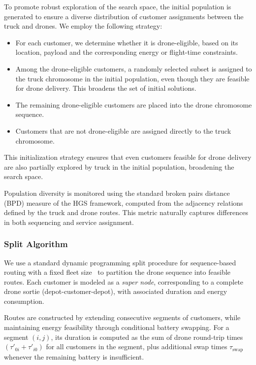 \documentclass[3p, authoryear, 11pt]{elsarticle}
\begin{document}
To promote robust exploration of the search space, the initial population is generated to ensure a diverse distribution of customer assignments between the truck and drones. We employ the following strategy:

\begin{itemize}
    \item For each customer, we determine whether it is drone-eligible, based on its location, payload and the corresponding energy or flight-time constraints.
    \item Among the drone-eligible customers, a randomly selected subset is assigned to the truck chromosome in the initial population, even though they are feasible for drone delivery. This broadens the set of initial solutions.
    \item The remaining drone-eligible customers are placed into the drone chromosome sequence.
    \item Customers that are not drone-eligible are assigned directly to the truck chromosome.
\end{itemize}

This initialization strategy ensures that even customers feasible for drone delivery are also partially explored by truck in the initial population, broadening the search space.

Population diversity is monitored using the standard broken pairs distance (BPD) measure of the HGS framework, computed from the adjacency relations defined by the truck and drone routes. This metric naturally captures differences in both sequencing and service assignment.

\subsubsection{Split Algorithm}

We use a standard dynamic programming split procedure for sequence-based routing with a fixed fleet size~\citep{prins_tour_split_2004, vidal_technical_2016} to partition the drone sequence into feasible routes. Each customer is modeled as a \emph{super node}, corresponding to a complete drone sortie (depot-customer-depot), with associated duration and energy consumption.

Routes are constructed by extending consecutive segments of customers, while maintaining energy feasibility through conditional battery swapping. 
For a segment $(i,j)$, its duration is computed as the sum of drone round-trip times 
$(\tau'_{0i} + \tau'_{i0})$ for all customers in the segment, plus additional swap times $\tau_{\mathrm{swap}}$ whenever the remaining battery is insufficient.
\end{document}
